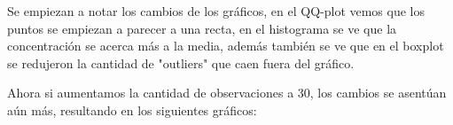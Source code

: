 \documentclass[a4paper]{article}
\begin{document}
	Se empiezan a notar los cambios de los gr\'aficos, en el QQ-plot vemos que los puntos se empiezan a parecer a una recta, en el histograma se ve que la concentraci\'on se acerca m\'as a la media, adem\'as tambi\'en se ve que en el boxplot se redujeron la cantidad de "outliers" que caen fuera del gr\'afico.
	
	Ahora si aumentamos la cantidad de observaciones a 30, los cambios se asent\'uan a\'un m\'as, resultando en los siguientes gr\'aficos:
	
	\begin{figure}[H]
		\centering
		\hfill

\end{figure}
\end{document}
